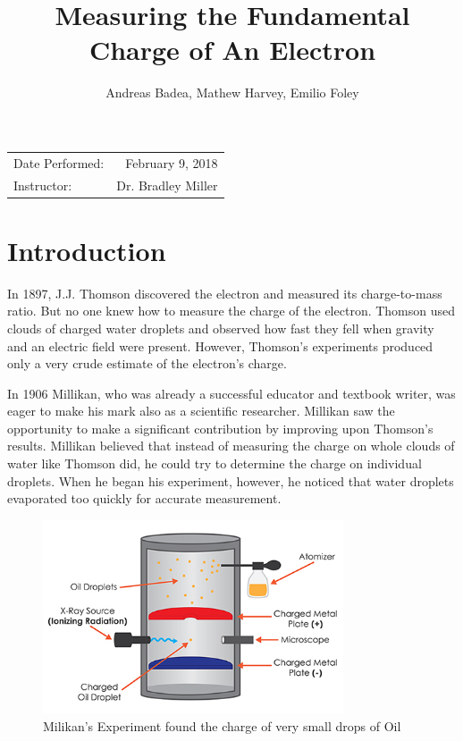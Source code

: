 \documentclass[]{article}
\title{Measuring the Fundamental Charge of An Electron}
\author{Andreas Badea, Mathew Harvey, Emilio Foley}
\begin{document}
\maketitle
\begin{center}
	\begin{tabular}{l r}
		Date Performed: & February 9, 2018 \\ %
		Instructor: & Dr. Bradley Miller %
	\end{tabular}
\end{center}

\section{Introduction}

In 1897, J.J. Thomson discovered the electron and measured its charge-to-mass ratio. But no one knew how to measure the charge of the electron. Thomson used clouds of charged water droplets and observed how fast they fell when gravity and an electric field were present. However, Thomson’s experiments produced only a very crude estimate of the electron’s charge. 

In 1906 Millikan, who was already a successful educator and textbook writer, was eager to make his mark also as a scientific researcher. Millikan saw the opportunity to make a significant contribution by improving upon Thomson’s results. Millikan believed that instead of measuring the charge on whole clouds of water like Thomson did, he could try to determine the charge on individual droplets. When he began his experiment, however, he noticed that water droplets evaporated too quickly for accurate measurement. 

\begin{figure}[ht]
	\begin{center}
		\includegraphics[width=3.5in]{diag}
	\end{center}
	\caption{Milikan's Experiment found the charge of very small drops of Oil}
\end{figure}
\end{document}
